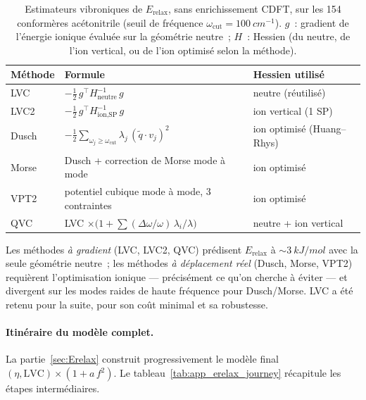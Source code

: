 \begin{table}[H]
\centering
\caption{Estimateurs vibroniques de $E_\text{relax}$, sans enrichissement CDFT, sur les 154 conformères acétonitrile (seuil de fréquence $\omega_\text{cut} = \SI{100}{cm^{-1}}$). $g$~: gradient de l'énergie ionique évaluée sur la géométrie neutre~; $H$~: Hessien (du neutre, de l'ion vertical, ou de l'ion optimisé selon la méthode).}
\label{tab:app_vibronic}
\footnotesize
\begin{tabular}{l l l}
\toprule
\textbf{Méthode} & \textbf{Formule} & \textbf{Hessien utilisé} \\
\midrule
LVC  & $-\tfrac{1}{2}\, g^\top H_\text{neutre}^{-1}\, g$ & neutre (réutilisé) \\
LVC2 & $-\tfrac{1}{2}\, g^\top H_\text{ion,SP}^{-1}\, g$ & ion vertical (1 SP) \\
Dusch & $-\tfrac{1}{2} \sum_{\omega_j \geq \omega_\text{cut}} \lambda_j\, (\tilde q \cdot v_j)^2$ & ion optimisé (Huang--Rhys) \\
Morse & Dusch + correction de Morse mode à mode & ion optimisé \\
VPT2  & potentiel cubique mode à mode, 3 contraintes & ion optimisé \\
QVC   & LVC $\times \bigl(1 + \sum (\Delta\omega/\omega)\, \lambda_i/\lambda\bigr)$ & neutre + ion vertical \\
\bottomrule
\end{tabular}
\end{table}

Les méthodes \emph{à gradient} (LVC, LVC2, QVC) prédisent $E_\text{relax}$ à $\sim\SI{3}{kJ/mol}$ avec la seule géométrie neutre~; les méthodes \emph{à déplacement réel} (Dusch, Morse, VPT2) requièrent l'optimisation ionique --- précisément ce qu'on cherche à éviter --- et divergent sur les modes raides de haute fréquence pour Dusch/Morse. LVC a été retenu pour la suite, pour son coût minimal et sa robustesse.

\paragraph{Itinéraire du modèle complet.}
La partie~\ref{sec:Erelax} construit progressivement le modèle final $(\eta, \text{LVC}) \times (1 + a\, f^2)$. Le tableau~\ref{tab:app_erelax_journey} récapitule les étapes intermédiaires.

